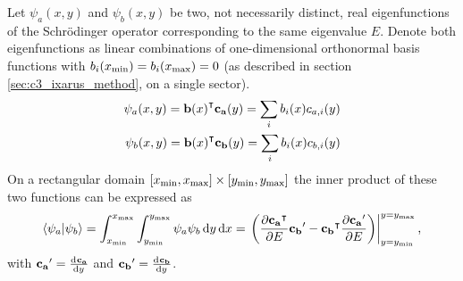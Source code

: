 \begin{theorem}\label{the:c3_dot_product}
  Let $\psi_a(x, y)$ and $\psi_b(x, y)$ be two, not necessarily distinct, real eigenfunctions of the Schrödinger operator corresponding to the same eigenvalue $E$. Denote both eigenfunctions as linear combinations of one-dimensional orthonormal basis functions with $b_i({x_{\text{min}}}) = b_i({x_{\text{max}}}) = 0$ (as described in section \ref{sec:c3_ixarus_method}, on a single sector).
  \begin{align*}
    \psi_a(x, y) = {\vb{b}(x)}^\intercal \vb{c_a}(y) = \sum_i b_i(x) c_{a, i}(y) \\
    \psi_b(x, y) = {\vb{b}(x)}^\intercal \vb{c_b}(y) = \sum_i b_i(x) c_{b, i}(y)
  \end{align*}
  On a rectangular domain $[{x_{\text{min}}}, {x_{\text{max}}}] \times [{y_{\text{min}}}, {y_{\text{max}}}]$ the inner product of these two functions can be expressed as
  $$
    \bra{\psi_a}\ket{\psi_b} = \int_{x_{\text{min}}}^{x_{\text{max}}} \int_{y_{\text{min}}}^{y_{\text{max}}} \psi_a\psi_b \, \dd y \, \dd x = \left. \left(\pdv{{\vb{c_a}}^\intercal}{E} \vb{c_b}' - {\vb{c_b}}^\intercal\pdv{\vb{c_a}'}{E} \right) \right|_{y={y_{\text{min}}}}^{y={y_{\text{max}}}} \text{,}
  $$
  with $\vb{c_a}' = \dv[]{\vb{c_a}}{y}$ and $\vb{c_b}' = \dv[]{\vb{c_b}}{y}$.
\end{theorem}

